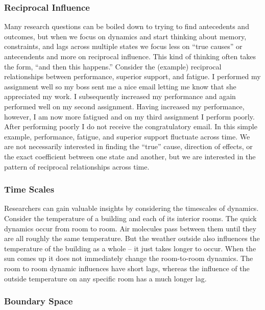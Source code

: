 \documentclass[english,,man]{apa6}
\theoremstyle{definition}
\theoremstyle{definition}
\theoremstyle{definition}
\theoremstyle{remark}
\begin{document}
\hypertarget{reciprocal-influence}{%
\subsubsection{Reciprocal Influence}\label{reciprocal-influence}}

Many research questions can be boiled down to trying to find antecedents
and outcomes, but when we focus on dynamics and start thinking about
memory, constraints, and lags across multiple states we focus less on
\enquote{true causes} or antecendents and more on reciprocal influence.
This kind of thinking often takes the form, \enquote{and then this
happens.} Consider the (example) reciprocal relationships between
performance, superior support, and fatigue. I performed my assignment
well so my boss sent me a nice email letting me know that she
appreciated my work. I subsequently increased my performance and again
performed well on my second assignment. Having increased my performance,
however, I am now more fatigued and on my third assignment I perform
poorly. After performing poorly I do not receive the congratulatory
email. In this simple example, performance, fatigue, and superior
support fluctuate across time. We are not necessarily interested in
finding the \enquote{true} cause, direction of effects, or the exact
coefficient between one state and another, but we are interested in the
pattern of reciprocal relationships across time.

\hypertarget{time-scales}{%
\subsubsection{Time Scales}\label{time-scales}}

Researchers can gain valuable insights by considering the timescales of
dynamics. Consider the temperature of a building and each of its
interior rooms. The quick dynamics occur from room to room. Air
molecules pass between them until they are all roughly the same
temperature. But the weather outside also influences the temperature of
the building as a whole -- it just takes longer to occur. When the sun
comes up it does not immediately change the room-to-room dynamics. The
room to room dynamic influences have short lags, whereas the influence
of the outside temperature on any specific room has a much longer lag.

\hypertarget{boundary-space}{%
\subsubsection{Boundary Space}\label{boundary-space}}
\end{document}
